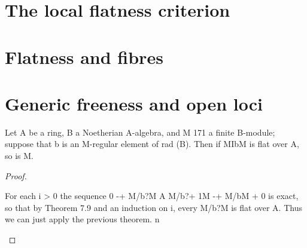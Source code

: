 
\section{The local flatness criterion}
\section{Flatness and fibres}
\section{Generic freeness and open loci}

\begin{theorem}[Theorem 22.2]\label{mcrt-auto-theorem-22-2}
\begin{mathematicalrecord}
Let A be a ring, B a Noetherian              A-algebra,    and M
                                                                              171
a finite B-module; suppose that b is an M-regular element of rad (B).
Then if MIbM is flat over A, so is M.
\end{mathematicalrecord}
\end{theorem}
\begin{proof}
\begin{mathematicalrecord}
For each i > 0 the sequence 0 -+ M/b?M A M/b?+ 1M -+
M/bM + 0 is exact, so that by Theorem 7.9 and an induction on i, every
M/b?M is flat over A. Thus we can just apply the previous theorem.   n
\end{mathematicalrecord}
\end{proof}


